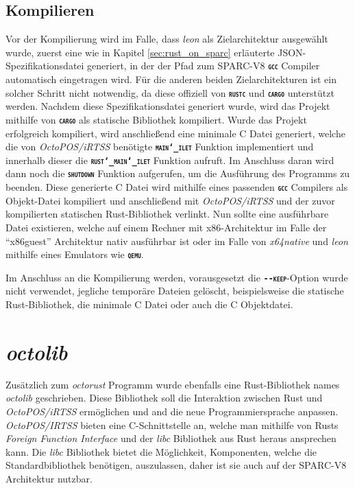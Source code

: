 \subsection{Kompilieren}

Vor der Kompilierung wird im Falle, dass \textit{leon} als Zielarchitektur ausgewählt wurde,
zuerst eine wie in Kapitel \ref{sec:rust_on_sparc} erläuterte
JSON-Spezifikationsdatei generiert,
in der der Pfad zum SPARC-V8 \texttt{\textsc{\textbf{gcc}}} Compiler automatisch eingetragen wird.
Für die anderen beiden Zielarchitekturen ist ein solcher Schritt nicht notwendig,
da diese offiziell von \texttt{\textsc{\textbf{rustc}}} und \texttt{\textsc{\textbf{cargo}}} unterstützt werden. 
Nachdem diese Spezifikationsdatei generiert wurde, wird das Projekt mithilfe von \texttt{\textsc{\textbf{cargo}}}
als statische Bibliothek kompiliert.
Wurde das Projekt erfolgreich kompiliert, wird anschließend eine minimale C Datei generiert,
welche die von \textit{OctoPOS/iRTSS} benötigte \texttt{\textsc{\textbf{main\char`_ilet}}} Funktion implementiert
und innerhalb dieser die \texttt{\textsc{\textbf{rust\char`_main\char`_ilet}}} Funktion aufruft.
Im Anschluss daran wird dann noch die \texttt{\textsc{\textbf{shutdown}}} Funktion aufgerufen, um die 
Ausführung des Programms zu beenden. Diese generierte C Datei wird mithilfe eines passenden
\texttt{\textsc{\textbf{gcc}}} Compilers als Objekt-Datei kompiliert
und anschließend mit \textit{OctoPOS/iRTSS} und der zuvor kompilierten statischen Rust-Bibliothek verlinkt.
Nun sollte eine ausführbare Datei existieren, welche auf einem Rechner mit x86-Architektur im Falle der "`x86guest"' 
Architektur nativ ausführbar ist oder im Falle von \textit{x64native} und \textit{leon} mithilfe eines Emulators wie 
\texttt{\textsc{\textbf{qemu}}}.

Im Anschluss an die Kompilierung werden,
vorausgesetzt die \texttt{\textsc{\textbf{-{}-keep}}}-Option wurde nicht verwendet,
jegliche temporäre Dateien gelöscht, beispielsweise die statische Rust-Bibliothek,
die minimale C Datei oder auch die C Objektdatei.

\section{\textit{octolib}}\label{sec:octolib}

Zusätzlich zum \textit{octorust} Programm wurde ebenfalls eine Rust-Bibliothek names \textit{octolib} geschrieben. 
Diese Bibliothek soll die Interaktion zwischen Rust und \textit{OctoPOS/iRTSS} ermöglichen und and die neue 
Programmiersprache anpassen. \textit{OctoPOS/IRTSS} bieten eine C-Schnittstelle an, welche man mithilfe von Rusts
\textit{Foreign Function Interface} und der \textit{libc} Bibliothek aus Rust heraus ansprechen kann.
Die \textit{libc} Bibliothek bietet die Möglichkeit, Komponenten, welche die Standardbibliothek benötigen, 
auszulassen, daher ist sie auch auf der SPARC-V8 Architektur nutzbar.

